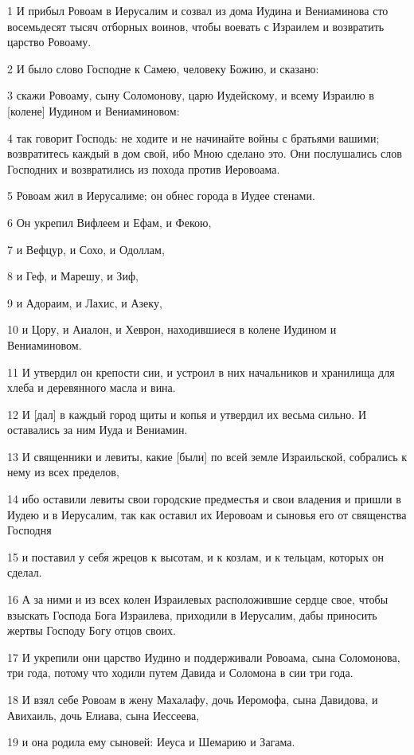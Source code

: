 \par 1 И прибыл Ровоам в Иерусалим и созвал из дома Иудина и Вениаминова сто восемьдесят тысяч отборных воинов, чтобы воевать с Израилем и возвратить царство Ровоаму.
\par 2 И было слово Господне к Самею, человеку Божию, и сказано:
\par 3 скажи Ровоаму, сыну Соломонову, царю Иудейскому, и всему Израилю в [колене] Иудином и Вениаминовом:
\par 4 так говорит Господь: не ходите и не начинайте войны с братьями вашими; возвратитесь каждый в дом свой, ибо Мною сделано это. Они послушались слов Господних и возвратились из похода против Иеровоама.
\par 5 Ровоам жил в Иерусалиме; он обнес города в Иудее стенами.
\par 6 Он укрепил Вифлеем и Ефам, и Фекою,
\par 7 и Вефцур, и Сохо, и Одоллам,
\par 8 и Геф, и Марешу, и Зиф,
\par 9 и Адораим, и Лахис, и Азеку,
\par 10 и Цору, и Аиалон, и Хеврон, находившиеся в колене Иудином и Вениаминовом.
\par 11 И утвердил он крепости сии, и устроил в них начальников и хранилища для хлеба и деревянного масла и вина.
\par 12 И [дал] в каждый город щиты и копья и утвердил их весьма сильно. И оставались за ним Иуда и Вениамин.
\par 13 И священники и левиты, какие [были] по всей земле Израильской, собрались к нему из всех пределов,
\par 14 ибо оставили левиты свои городские предместья и свои владения и пришли в Иудею и в Иерусалим, так как оставил их Иеровоам и сыновья его от священства Господня
\par 15 и поставил у себя жрецов к высотам, и к козлам, и к тельцам, которых он сделал.
\par 16 А за ними и из всех колен Израилевых расположившие сердце свое, чтобы взыскать Господа Бога Израилева, приходили в Иерусалим, дабы приносить жертвы Господу Богу отцов своих.
\par 17 И укрепили они царство Иудино и поддерживали Ровоама, сына Соломонова, три года, потому что ходили путем Давида и Соломона в сии три года.
\par 18 И взял себе Ровоам в жену Махалафу, дочь Иеромофа, сына Давидова, и Авихаиль, дочь Елиава, сына Иессеева,
\par 19 и она родила ему сыновей: Иеуса и Шемарию и Загама.
